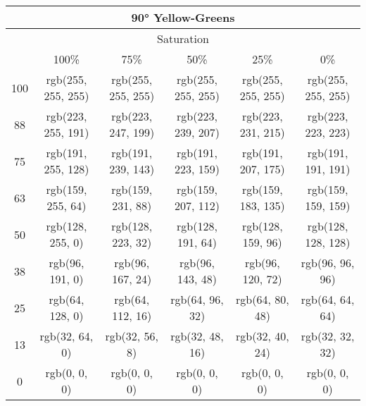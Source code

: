 \documentclass[a4j]{jarticle}
\begin{document}
\begin{tabular}{|c|c|c|c|c|c|}
\multicolumn{6}{|c|}{90°
 Yellow-Greens}\\\hline\multicolumn{6}{|c|}{Saturation}\\\hline&100\%&75\%&50\%&25\%&0\%\\\hline100&rgb(255,
     255, 255)&rgb(255, 255, 255)&rgb(255, 255, 255)&rgb(255, 255,
                 255)&rgb(255, 255, 255)\\\hline88&rgb(223, 255,
     191)&rgb(223, 247, 199)&rgb(223, 239, 207)&rgb(223, 231,
                 215)&rgb(223, 223, 223)\\\hline75&rgb(191, 255,
     128)&rgb(191, 239, 143)&rgb(191, 223, 159)&rgb(191, 207,
                 175)&rgb(191, 191, 191)\\\hline63&rgb(159, 255,
     64)&rgb(159, 231, 88)&rgb(159, 207, 112)&rgb(159, 183,
                 135)&rgb(159, 159, 159)\\\hline50&rgb(128, 255,
     0)&rgb(128, 223, 32)&rgb(128, 191, 64)&rgb(128, 159, 96)&rgb(128,
                     128, 128)\\\hline38&rgb(96, 191, 0)&rgb(96, 167,
         24)&rgb(96, 143, 48)&rgb(96, 120, 72)&rgb(96, 96,
                     96)\\\hline25&rgb(64, 128, 0)&rgb(64, 112,
         16)&rgb(64, 96, 32)&rgb(64, 80, 48)&rgb(64, 64,
                     64)\\\hline13&rgb(32, 64, 0)&rgb(32, 56, 8)&rgb(32,
             48, 16)&rgb(32, 40, 24)&rgb(32, 32, 32)\\\hline0&rgb(0, 0,
     0)&rgb(0, 0, 0)&rgb(0, 0, 0)&rgb(0, 0, 0)&rgb(0, 0, 0) 
\end{tabular}
\end{document}

